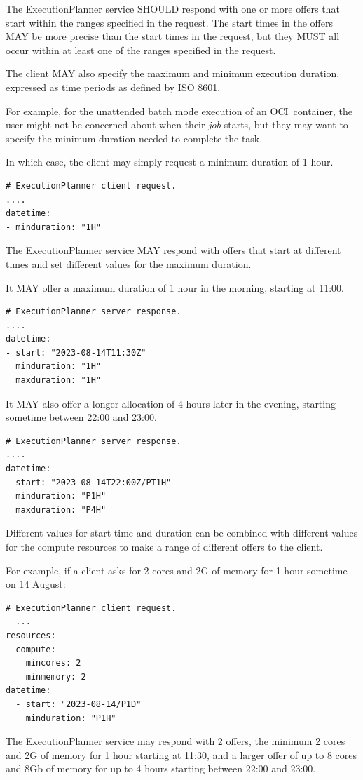 \documentclass[11pt,a4paper]{ivoa}
\newcommand{\execplanner} {ExecutionPlanner}
\newcommand{\ocicontainer} {OCI~container}
\newcommand{\job} {\textit{job}}
\begin{document}
The \execplanner{} service SHOULD respond with one or more offers that start within
the ranges specified in the request.
The start times in the offers MAY be more precise than the start times in the request,
but they MUST all occur within at least one of the ranges specified in the request.

The client MAY also specify the maximum and minimum execution duration,
expressed as time periods as defined by ISO 8601.

For example, for the unattended batch mode execution of an \ocicontainer, the user might not be concerned about
when their \job{} starts, but they may want to specify the minimum duration needed to complete the task.

In which case, the client may simply request a minimum duration of 1 hour.
\begin{lstlisting}[]
# ExecutionPlanner client request.
....
datetime:
- minduration: "1H"
\end{lstlisting}

The \execplanner{} service MAY respond with offers that start at different times and
set different values for the maximum duration.

It MAY offer a maximum duration of 1 hour in the morning, starting at 11:00.
\begin{lstlisting}[]
# ExecutionPlanner server response.
....
datetime:
- start: "2023-08-14T11:30Z"
  minduration: "1H"
  maxduration: "1H"
\end{lstlisting}

It MAY also offer a longer allocation of 4 hours later in the evening,
starting sometime between 22:00 and 23:00.
\begin{lstlisting}[]
# ExecutionPlanner server response.
....
datetime:
- start: "2023-08-14T22:00Z/PT1H"
  minduration: "P1H"
  maxduration: "P4H"
\end{lstlisting}

Different values for start time and duration can be combined with different values for the
compute resources to make a range of different offers to the client.

For example, if a client asks for 2 cores and 2G of memory for 1 hour sometime on 14 August:
\begin{lstlisting}[]
# ExecutionPlanner client request.
  ...
resources:
  compute:
    mincores: 2
    minmemory: 2
datetime:
  - start: "2023-08-14/P1D"
    minduration: "P1H"
\end{lstlisting}

The  \execplanner{} service may respond with 2 offers,
the minimum 2 cores and 2G of memory for 1 hour starting at 11:30,
and a larger offer of up to 8 cores and 8Gb of memory for up to 4 hours
starting between 22:00 and 23:00.
\end{document}
